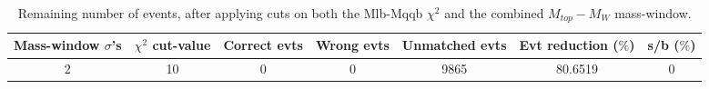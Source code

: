 \documentclass{article}
\begin{document}
 \begin{table}[h!t] 
  \caption{Remaining number of events, after applying cuts on both the Mlb-Mqqb $\chi^{2}$ and the combined $M_{top}-M_{W}$ mass-window.} 
  \centering 

   \begin{tabular}{c|c|c|c|c|c|c}
    Mass-window $\sigma$'s & $\chi^{2}$ cut-value   & Correct evts   & Wrong evts    & Unmatched evts & Evt reduction ($\%$)   & s/b ($\%$)    \\
     \hline
     2 & 10 & 0 & 0 & 9865 & 80.6519 & 0
   \end{tabular} 
 \end{table} 
 
\end{document}
